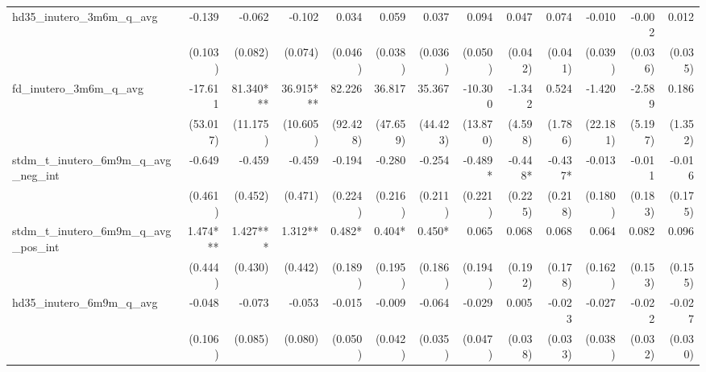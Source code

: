 \begin{tabular}{lrrrrrrrrrrrr}
hd35\_inutero\_3m6m\_q\_avg                 &       -0.139 &       -0.062 &       -0.102 &        0.034 &        0.059 &        0.037 &        0.094 &        0.047 &        0.074 &       -0.010 &       -0.002 &        0.012 \\ 
                                            &      (0.103) &      (0.082) &      (0.074) &      (0.046) &      (0.038) &      (0.036) &      (0.050) &      (0.042) &      (0.041) &      (0.039) &      (0.036) &      (0.035) \\ 
fd\_inutero\_3m6m\_q\_avg                   &      -17.611 &    81.340*** &    36.915*** &       82.226 &       36.817 &       35.367 &      -10.300 &       -1.342 &        0.524 &       -1.420 &       -2.589 &        0.186 \\ 
                                            &     (53.017) &     (11.175) &     (10.605) &     (92.428) &     (47.659) &     (44.423) &     (13.870) &      (4.598) &      (1.786) &     (22.181) &      (5.197) &      (1.352) \\ 
stdm\_t\_inutero\_6m9m\_q\_avg\_neg\_int    &       -0.649 &       -0.459 &       -0.459 &       -0.194 &       -0.280 &       -0.254 &      -0.489* &      -0.448* &      -0.437* &       -0.013 &       -0.011 &       -0.016 \\ 
                                            &      (0.461) &      (0.452) &      (0.471) &      (0.224) &      (0.216) &      (0.211) &      (0.221) &      (0.225) &      (0.218) &      (0.180) &      (0.183) &      (0.175) \\ 
stdm\_t\_inutero\_6m9m\_q\_avg\_pos\_int    &     1.474*** &     1.427*** &      1.312** &       0.482* &       0.404* &       0.450* &        0.065 &        0.068 &        0.068 &        0.064 &        0.082 &        0.096 \\ 
                                            &      (0.444) &      (0.430) &      (0.442) &      (0.189) &      (0.195) &      (0.186) &      (0.194) &      (0.192) &      (0.178) &      (0.162) &      (0.153) &      (0.155) \\ 
hd35\_inutero\_6m9m\_q\_avg                 &       -0.048 &       -0.073 &       -0.053 &       -0.015 &       -0.009 &       -0.064 &       -0.029 &        0.005 &       -0.023 &       -0.027 &       -0.022 &       -0.027 \\ 
                                            &      (0.106) &      (0.085) &      (0.080) &      (0.050) &      (0.042) &      (0.035) &      (0.047) &      (0.038) &      (0.033) &      (0.038) &      (0.032) &      (0.030) \\ 

\end{tabular}
